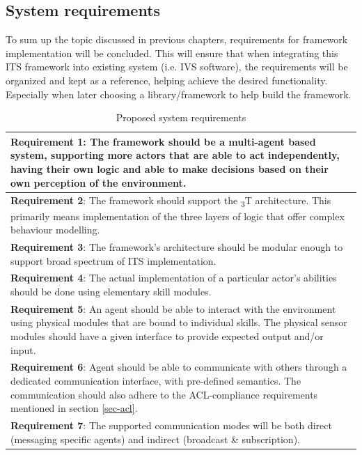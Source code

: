 \documentclass[main.tex]{subfiles}
\begin{document}
\subsection{System requirements}

To sum up the topic discussed in previous chapters, requirements for framework implementation will be 
concluded. This will ensure that when integrating this ITS framework into existing system (i.e. IVS 
software), the requirements will be organized and kept as a reference, helping achieve the desired 
functionality. Especially when later choosing a library/framework to help build the framework. 

\begin{table}[htbp]
    \caption{Proposed system requirements}
    \centering\begin{tabular}{>{\footnotesize}p{}}
        \toprule
\textbf{Requirement 1}: The framework should be a multi-agent based system, supporting more actors 
that are able to act independently, having their own logic and able to make decisions based on their 
own perception of the environment.
\\ \midrule
\textbf{Requirement 2}: The framework should support the \textsubscript{3}T architecture. 
This primarily means implementation of the three layers of logic that offer complex behaviour 
modelling.
\\ \midrule
\textbf{Requirement 3}: The framework's architecture should be modular enough to support broad 
spectrum of ITS implementation.
\\ \midrule
\textbf{Requirement 4}: The actual implementation of a particular actor's abilities should be done using 
elementary skill modules.
\\ \midrule
\textbf{Requirement 5}: An agent should be able to interact with the environment using physical modules 
that are bound to individual skills. The physical sensor modules should have a given interface to provide 
expected output and/or input. 
\\ \midrule
\textbf{Requirement 6}: Agent should be able to communicate with others through a dedicated communication 
interface, with pre-defined semantics. The communication should also adhere to the ACL-compliance requirements 
mentioned in section \ref{sec-acl}. 
\\ \midrule
\textbf{Requirement 7}: The supported communication modes will be both direct (messaging specific agents) and indirect  
(broadcast \& subscription). 
\\ \midrule

\end{tabular}
\end{table}
\end{document}
